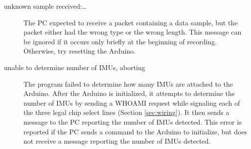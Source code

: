 \documentclass[11pt,letterpaper,article,oneside]{memoir}
\begin{document}
\begin{description}
\item[unknown sample received:\dots]
The PC expected to receive a packet containing a data sample, but the packet
either had the wrong type or the wrong length. This message can be ignored if it
occurs only briefly at the beginning of recording. Otherwise, try resetting the
Arduino.

\item[unable to determine number of IMUs, aborting]
The program failed to determine how many IMUs are attached to the Arduino. After
the Arduino is initialized, it attempts to determine the number of IMUs by
sending a WHOAMI request while signaling each of the three legal chip select
lines (Section \ref{sec:wiring}). It then sends a message to the PC reporting the
number of IMUs detected. This error is reported if the PC sends a
command to the Arduino to initialize, but does not receive a message reporting
the number of IMUs detected.
\genericFix{}


\end{description}
\end{document}
